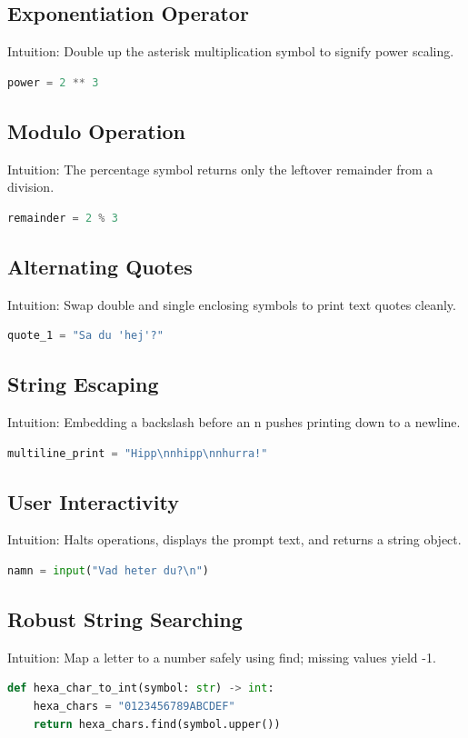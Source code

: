 \documentclass{article}
\begin{document}
\subsection{Exponentiation Operator}
Intuition: Double up the asterisk multiplication symbol to signify power scaling.
\begin{lstlisting}[language=Python]
power = 2 ** 3
\end{lstlisting}

\subsection{Modulo Operation}
Intuition: The percentage symbol returns only the leftover remainder from a division.
\begin{lstlisting}[language=Python]
remainder = 2 % 3
\end{lstlisting}

\subsection{Alternating Quotes}
Intuition: Swap double and single enclosing symbols to print text quotes cleanly.
\begin{lstlisting}[language=Python]
quote_1 = "Sa du 'hej'?"
\end{lstlisting}

\subsection{String Escaping}
Intuition: Embedding a backslash before an n pushes printing down to a newline.
\begin{lstlisting}[language=Python]
multiline_print = "Hipp\nnhipp\nnhurra!"
\end{lstlisting}

\subsection{User Interactivity}
Intuition: Halts operations, displays the prompt text, and returns a string object.
\begin{lstlisting}[language=Python]
namn = input("Vad heter du?\n")
\end{lstlisting}

\subsection{Robust String Searching}
Intuition: Map a letter to a number safely using find; missing values yield -1.
\begin{lstlisting}[language=Python]
def hexa_char_to_int(symbol: str) -> int:
    hexa_chars = "0123456789ABCDEF"
    return hexa_chars.find(symbol.upper())
\end{lstlisting}
\end{document}

